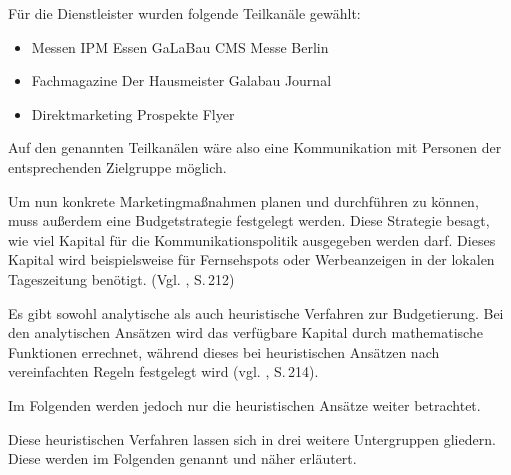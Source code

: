             \noindent
            Für die Dienstleister wurden folgende Teilkanäle gewählt:
        
             \begin{itemize}
                \item Messen
                    \subitem IPM Essen
                    \subitem GaLaBau
                    \subitem CMS Messe Berlin
                
                \item Fachmagazine
                    \subitem Der Hausmeister
                    \subitem Galabau Journal
        
                \item Direktmarketing
                    \subitem Prospekte
                    \subitem Flyer
             \end{itemize}
        
            \noindent
            Auf den genannten Teilkanälen wäre also eine Kommunikation mit Personen der entsprechenden Zielgruppe möglich.
        
            \noindent
            Um nun konkrete Marketingmaßnahmen planen und durchführen zu können, muss außerdem eine Budgetstrategie festgelegt
            werden. Diese Strategie besagt, wie viel Kapital für die Kommunikationspolitik ausgegeben werden darf. Dieses
            Kapital wird beispielsweise für Fernsehspots oder Werbeanzeigen in der lokalen Tageszeitung benötigt.
            (Vgl. \cite{Bruhn2014a}, S.\,212)
        
            \noindent
            Es gibt sowohl analytische als auch heuristische Verfahren zur Budgetierung. Bei den analytischen Ansätzen wird das
            verfügbare Kapital durch mathematische Funktionen errechnet, während dieses bei heuristischen Ansätzen nach
            vereinfachten Regeln festgelegt wird (vgl. \cite{Bruhn2014a}, S.\,214).
        
            \noindent
            Im Folgenden werden jedoch nur die heuristischen Ansätze weiter betrachtet.
        
            \noindent
            Diese heuristischen Verfahren lassen sich in drei weitere Untergruppen gliedern. Diese werden im Folgenden genannt
            und näher erläutert.
        
